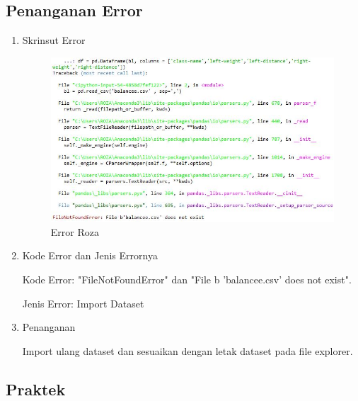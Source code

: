 \begin{enumerate}
\begin{enumerate}
\subsection{Penanganan Error}
\begin{enumerate}
\item Skrinsut Error
\begin{figure}[ht]
\centering
\includegraphics[scale=0.5]{figures/erorque.jpg}
\caption{ Error Roza}
\label{6}
\end{figure}
\item Kode Error dan Jenis Errornya
\par Kode Error: "FileNotFoundError" dan "File b 'balancee.csv' does not exist". 
\par Jenis Error: Import Dataset
\item Penanganan
\par Import ulang dataset dan sesuaikan dengan letak dataset pada file explorer.

\end{enumerate}
\end{enumerate}

\end{enumerate}

\subsection{Praktek}